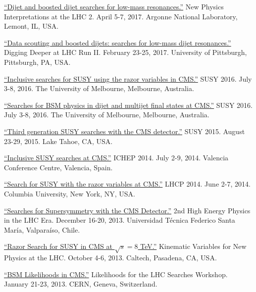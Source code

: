 \documentclass[11pt]{res}
\begin{document}
\begin{resume}
\href{https://indico.cern.ch/event/540843/contributions/2464658/}{``Dijet
    and boosted dijet searches for low-mass resonances.''} New Physics Interpretations at the LHC 2. April
  5-7, 2017. Argonne National Laboratory, Lemont, IL, USA.

\href{https://indico.cern.ch/event/592671/contributions/2401900/}{``Data
    scouting and boosted dijets: searches for low-mass dijet
    resonances.''} Digging Deeper at LHC Run II. February
  23-25, 2017. University of Pittsburgh, Pittsburgh, PA, USA.

\href{https://indico.cern.ch/event/443176/contributions/2148316/}{``Inclusive
    searches for SUSY using the razor variables in CMS.''} SUSY 2016. July 3-8, 2016. The University of Melbourne,
  Melbourne, Australia.

\href{https://indico.cern.ch/event/443176/contributions/2154549/}{``Searches
    for BSM physics in dijet and multijet final states at CMS.''} SUSY 2016. July 3-8, 2016. The University of Melbourne,
  Melbourne, Australia.

\href{https://indico.cern.ch/event/331032/contributions/1720249/}{``Third
    generation SUSY searches with the CMS detector.''} SUSY 2015. August 23-29, 2015. Lake Tahoe,
  CA, USA.

\href{https://indico.ific.uv.es/indico/contributionDisplay.py?sessionId=24&contribId=289&confId=2025}{``Inclusive
    SUSY searches at CMS.''} ICHEP 2014. July 2-9, 2014. Valencia
  Conference Centre, Valencia, Spain.

\href{https://indico.cern.ch/event/279518/contributions/634785/}{``Search
    for SUSY with the razor variables at CMS.''} LHCP 2014. June
  2-7, 2014. Columbia University, New York, NY, USA.

\href{https://indico.cern.ch/event/252857/contributions/1579321/}{``Searches
    for Supersymmetry with the CMS Detector.''} 2nd
  High Energy Physics in the LHC Era. December 16-20,
  2013. Universidad T\'{e}cnica Federico Santa Mar\'{i}a,
  Valpara\'{i}so, Chile.

\href{https://indico.cern.ch/event/261650/contributions/586374/}{``Razor
    Search for SUSY in CMS at $\sqrt{s}=8$ TeV.''} Kinematic Variables for
  New Physics at the LHC. October 4-6, 2013. Caltech, Pasadena, CA, USA.

\href{https://indico.cern.ch/event/218693/contributions/1520333/}{``BSM Likelihoods in CMS.''} Likelihoods for
    the LHC Searches Workshop. January 21-23, 2013. CERN, Geneva,
    Switzerland.



\end{resume}
\end{document}

